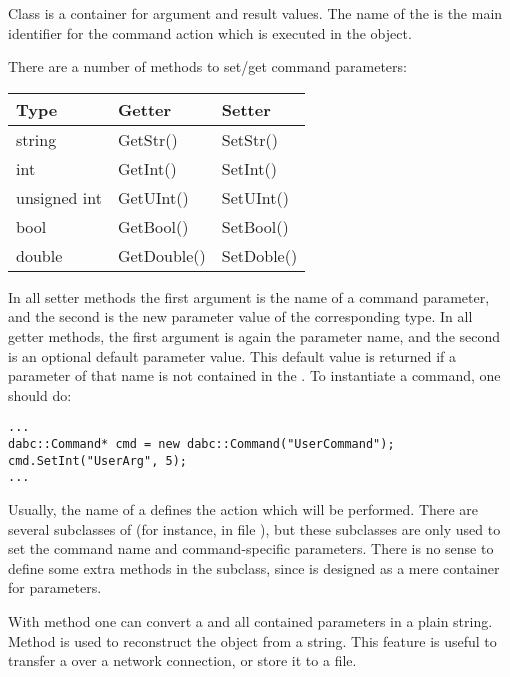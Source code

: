 Class  is a container for argument and result values.
The name of the  is the main identifier 
for the command action which is executed in the  object.

There are a number of methods to set/get command parameters:

\begin{tabular}{l|l|l}
Type &  Getter & Setter  \\
   \hline
string  & GetStr() &  SetStr() \\
int  & GetInt() &  SetInt() \\
unsigned int  & GetUInt() &  SetUInt() \\
bool  & GetBool() &  SetBool() \\
double  & GetDouble() &  SetDoble() \\
\end{tabular}

In all setter methods the first argument is the name of a command parameter,
and the second is the new parameter value
of the corresponding type. In all getter methods, the first argument is again 
the parameter name, and the second is an optional default parameter value. 
This default value is returned if a parameter of that name is 
not contained in the . 
To instantiate a command, one should do: 

\begin{small}
\begin{verbatim}
...
dabc::Command* cmd = new dabc::Command("UserCommand");
cmd.SetInt("UserArg", 5);
...
\end{verbatim}     
\end{small}
   
Usually, the name of a  defines the action which will be performed.
There are several subclasses of  (for instance, in
file ), but these subclasses are only used to set the 
command name and command-specific parameters. There is no sense to define 
some extra methods in the subclass, since  is designed 
as a mere container for parameters.

With method  one can convert a  
and all contained parameters in
a plain string. Method  is used to reconstruct 
the  object from a string. This feature is useful to transfer
a  over a network connection, or store it to a file. 


